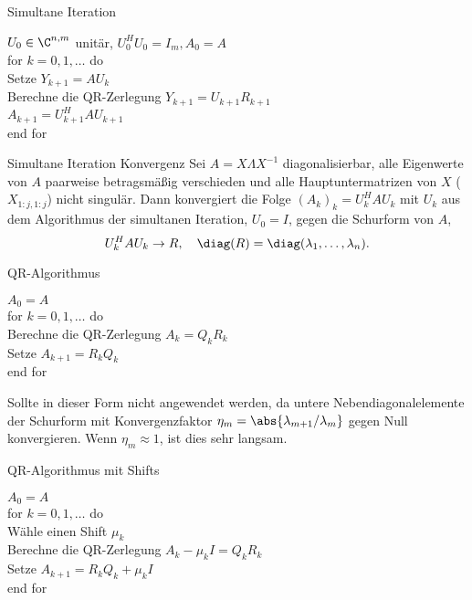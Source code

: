 \begin{karte}{Simultane Iteration}
    \begin{tabbing}
        \( U_0 \in \C^{n,m} \) unitär, \(U_0^H U_0 = I_m, A_0 = A\) \\
        for \= \( k = 0,1,\ldots \) do \\
        \> Setze \( Y_{k+1} = A U_k \) \\
        \> Berechne die QR-Zerlegung \( Y_{k+1} = U_{k+1} R_{k+1} \) \\
        \> \( A_{k+1} = U_{k+1}^H A U_{k+1} \) \\
        end for
    \end{tabbing}
\end{karte}

\begin{karte}{Simultane Iteration Konvergenz}
    Sei \( A = X \Lambda X^{-1} \) diagonalisierbar, alle Eigenwerte von \(A\) 
    paarweise betragsmäßig verschieden und alle Hauptuntermatrizen von \( X \)
    (\(X_{1:j, 1:j}\)) nicht singulär. Dann konvergiert die Folge \( (A_k)_k = U_k^H A U_k \)
    mit \( U_k \) aus dem Algorithmus der simultanen Iteration, \( U_0 = I \), 
    gegen die Schurform von \(A\), 
    \[ U_k^H A U_k \rightarrow R, \quad \diag(R) = \diag(\lambda_1, \ldots, \lambda_n). \]
\end{karte}

\begin{karte}{QR-Algorithmus}
    \begin{tabbing}
        \( A_0 = A \) \\
        for \= \( k = 0,1,\ldots \) do \\
        \> Berechne die QR-Zerlegung \( A_k = Q_k R_k \) \\
        \> Setze \( A_{k+1} = R_k Q_k \) \\
        end for
    \end{tabbing}
    Sollte in dieser Form nicht angewendet werden, 
    da untere Nebendiagonalelemente der Schurform mit 
    Konvergenzfaktor \( \eta_m = \abs{\lambda_{m+1} / \lambda_m} \)
    gegen Null konvergieren. Wenn \( \eta_m \approx 1 \), ist dies sehr langsam.
\end{karte}

\begin{karte}{QR-Algorithmus mit Shifts}
    \begin{tabbing}
        \( A_0 = A \) \\
        for \= \( k = 0,1,\ldots \) do \\
        \> Wähle einen Shift \(\mu_k\) \\
        \> Berechne die QR-Zerlegung \( A_k - \mu_k I = Q_k R_k \) \\
        \> Setze \( A_{k+1} = R_k Q_k + \mu_k I \) \\
        end for
    \end{tabbing}
\end{karte}

